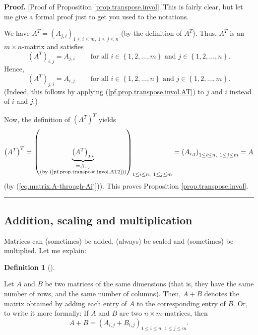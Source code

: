 \documentclass[numbers=enddot,12pt,final,onecolumn,notitlepage]{scrartcl}%
\theoremstyle{definition}
\newtheorem{defi}[theo]{Definition}
\newenvironment{definition}[1][]
{\begin{defi}[#1]\begin{leftbar}}
{\end{leftbar}\end{defi}}
\newenvironment{proof}[1][Proof]{\noindent\textbf{#1.} }{\ \rule{0.5em}{0.5em}}
\begin{document}
\begin{proof}
[Proof of Proposition \ref{prop.transpose.invol}.]This is fairly clear, but
let me give a formal proof just to get you used to the notations.

We have $A^{T}=\left(  A_{j,i}\right)  _{1\leq i\leq m,\ 1\leq j\leq n}$ (by
the definition of $A^{T}$). Thus, $A^{T}$ is an $m\times n$-matrix and
satisfies%
\begin{equation}
\left(  A^{T}\right)  _{i,j}=A_{j,i}\ \ \ \ \ \ \ \ \ \ \text{for all }%
i\in\left\{  1,2,\ldots,m\right\}  \text{ and }j\in\left\{  1,2,\ldots
,n\right\}  . \label{pf.prop.transpose.invol.AT}%
\end{equation}
Hence,%
\begin{equation}
\left(  A^{T}\right)  _{j,i}=A_{i,j}\ \ \ \ \ \ \ \ \ \ \text{for all }%
i\in\left\{  1,2,\ldots,n\right\}  \text{ and }j\in\left\{  1,2,\ldots
,m\right\}  . \label{pf.prop.transpose.invol.AT2}%
\end{equation}
(Indeed, this follows by applying (\ref{pf.prop.transpose.invol.AT}) to $j$
and $i$ instead of $i$ and $j$.)

Now, the definition of $\left(  A^{T}\right)  ^{T}$ yields%
\[
\left(  A^{T}\right)  ^{T}=\left(  \underbrace{\left(  A^{T}\right)  _{j,i}%
}_{\substack{=A_{i,j}\\\text{(by (\ref{pf.prop.transpose.invol.AT2}))}%
}}\right)  _{1\leq i\leq n,\ 1\leq j\leq m}=\left(  A_{i,j}\right)  _{1\leq
i\leq n,\ 1\leq j\leq m}=A
\]
(by (\ref{eq.matrix.A-through-Aij})). This proves Proposition
\ref{prop.transpose.invol}.
\end{proof}

\subsection{Addition, scaling and multiplication}

Matrices can (sometimes) be added, (always) be scaled and (sometimes) be
multiplied. Let me explain:

\begin{definition}
\label{def.matrix-add}Let $A$ and $B$ be two matrices of the same dimensions
(that is, they have the same number of rows, and the same number of columns).
Then, $A+B$ denotes the matrix obtained by adding each entry of $A$ to the
corresponding entry of $B$. Or, to write it more formally: If $A$ and $B$ are
two $n\times m$-matrices, then%
\[
A+B=\left(  A_{i,j}+B_{i,j}\right)  _{1\leq i\leq n,\ 1\leq j\leq m}.
\]

\end{definition}
\end{document}
